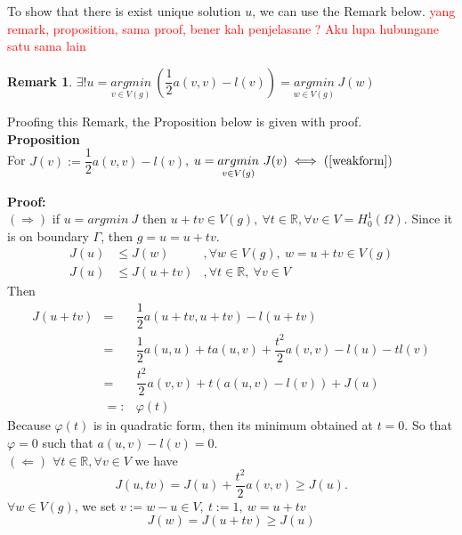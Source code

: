 \documentclass[]{report}
\newtheorem{remark}{Remark}[section]
\begin{document}
To show that there is exist unique solution $ u $, we can use the Remark below. \textcolor{red}{yang remark, proposition, sama proof, bener kah penjelasane ? Aku lupa hubungane satu sama lain}
\begin{remark}
	$ \exists ! u = \underset{v \in V(g)}{argmin} \ (\dfrac{1}{2} a(v,v)-l(v)) = \underset{w \in V(g)}{argmin} \ J(w)$
\end{remark}

Proofing this Remark, the Proposition below is given with proof.\\
\textbf{Proposition}\\
For \hspace{0.5cm} $ J(v) := \dfrac{1}{2} a(v,v) -l (v) $, \hspace{1cm}
$ u = \underset{v \in V(g)}{argmin} \ J(v) \iff (\ref{weakform}) $

\textbf{Proof:}\\
$ (\Rightarrow) $ if $ u = argmin \ J $ then $ u+tv \in V(g) , \ \forall t \in \mathbb{R}, \forall v \in V = H_{0}^{1} (\Omega) $. Since it is on boundary $ \Gamma $, then $ g=u=u+tv $.
\begin{eqnarray}\nonumber
J(u) &\leq J(w) &, \forall w \in V(g), \ w=u+tv \in V(g)\\ \nonumber
J(u) &\leq J(u+tv) &, \forall t \in \mathbb{R}, \ \forall v \in V
\end{eqnarray}
Then
\begin{eqnarray}\nonumber
J(u+tv) &=& \dfrac{1}{2} a(u+tv,u+tv)-l(u+tv)\\ \nonumber
&=& \dfrac{1}{2} a(u,u) + t a(u,v) + \dfrac{t^2}{2} a (v,v) - l(u) - t l(v)\\ \nonumber
&=& \dfrac{t^2}{2} a (v,v) + t (a(u,v) - l(v)) + J(u)\\ \nonumber
&=:& \varphi(t)
\end{eqnarray}
Because $ \varphi(t) $ is in quadratic form, then its minimum obtained at $ t=0 $. So that $ \varphi =0 $ such that $ a(u,v) - l(v) =0 $.\\
$ (\Leftarrow) $ $ \forall t \in \mathbb{R}, \forall v \in V $ we have
\begin{equation}\nonumber
J(u,tv) = J(u) + \dfrac{t^2}{2} a(v,v) \geq J(u).
\end{equation}
$ \forall w \in V(g) $, we set $ v := w -u \in V , \ t:=1 , \ w=u+tv $
\begin{equation}\nonumber
J(w) = J(u+tv) \geq J(u)
\end{equation}
\end{document}
